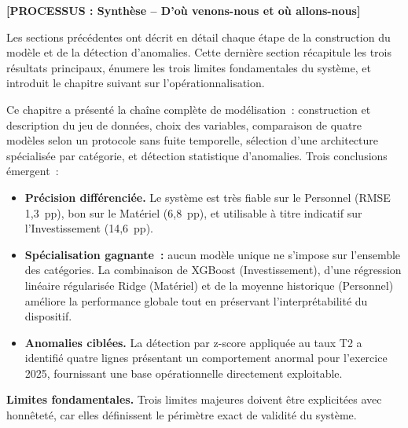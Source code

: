 \textbf{[PROCESSUS : Synth\`ese -- D'o\`u venons-nous et o\`u allons-nous]}

\noindent Les sections pr\'ec\'edentes ont d\'ecrit en d\'etail chaque \'etape de la
construction du mod\`ele et de la d\'etection d'anomalies. Cette derni\`ere section
r\'ecapitule les trois r\'esultats principaux, \'enumere les trois limites
fondamentales du syst\`eme, et introduit le chapitre suivant sur l'op\'erationnalisation.

Ce chapitre a pr\'esent\'e la cha\^ine compl\`ete de mod\'elisation~: construction et
description du jeu de donn\'ees, choix des variables, comparaison de quatre mod\`eles
selon un protocole sans fuite temporelle, s\'election d'une architecture sp\'ecialis\'ee
par cat\'egorie, et d\'etection statistique d'anomalies. Trois conclusions \'emergent~:

\begin{itemize}
    \item \textbf{Pr\'ecision diff\'erenci\'ee.} Le syst\`eme est tr\`es fiable sur le
    Personnel (RMSE 1{,}3~pp), bon sur le Mat\'eriel (6{,}8~pp), et utilisable
    \`a titre indicatif sur l'Investissement (14{,}6~pp).

    \item \textbf{Sp\'ecialisation gagnante~:} aucun mod\`ele unique ne s'impose
    sur l'ensemble des cat\'egories. La combinaison de XGBoost (Investissement),
    d'une r\'egression lin\'eaire r\'egularis\'ee Ridge (Mat\'eriel) et de la moyenne
    historique (Personnel) am\'eliore la performance globale tout en pr\'eservant
    l'interpr\'etabilit\'e du dispositif.

    \item \textbf{Anomalies cibl\'ees.} La d\'etection par z-score appliqu\'ee au
    taux T2 a identifi\'e quatre lignes pr\'esentant un comportement anormal pour
    l'exercice 2025, fournissant une base op\'erationnelle directement exploitable.
\end{itemize}

\textbf{Limites fondamentales.} Trois limites majeures doivent \^etre explicit\'ees avec
honn\^etet\'e, car elles d\'efinissent le p\'erim\`etre exact de validit\'e du syst\`eme.

